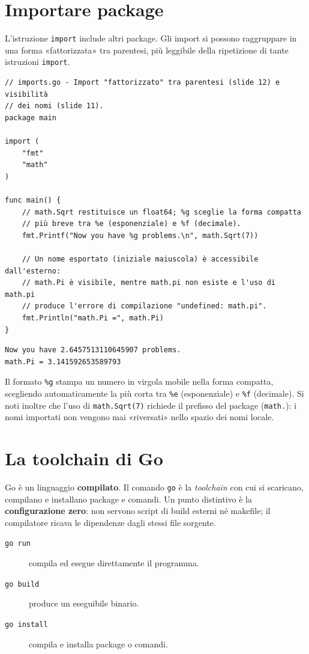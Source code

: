 \documentclass[11pt,a4paper]{report}
\newcommand{\cod}[1]{\texttt{#1}}
\begin{document}
\section{Importare package}\label{sec:import}

L'istruzione \cod{import} include altri package. Gli import si possono
raggruppare in una forma «fattorizzata» tra parentesi, più leggibile della
ripetizione di tante istruzioni \cod{import}.

\begin{lstlisting}[style=gocode,caption={\texttt{01\_basics/imports.go}}]
// imports.go - Import "fattorizzato" tra parentesi (slide 12) e visibilità
// dei nomi (slide 11).
package main

import (
	"fmt"
	"math"
)

func main() {
	// math.Sqrt restituisce un float64; %g sceglie la forma compatta
	// più breve tra %e (esponenziale) e %f (decimale).
	fmt.Printf("Now you have %g problems.\n", math.Sqrt(7))

	// Un nome esportato (iniziale maiuscola) è accessibile dall'esterno:
	// math.Pi è visibile, mentre math.pi non esiste e l'uso di math.pi
	// produce l'errore di compilazione "undefined: math.pi".
	fmt.Println("math.Pi =", math.Pi)
}
\end{lstlisting}
\begin{lstlisting}[style=output]
Now you have 2.6457513110645907 problems.
math.Pi = 3.141592653589793
\end{lstlisting}

Il formato \cod{\%g} stampa un numero in virgola mobile nella forma compatta,
scegliendo automaticamente la più corta tra \cod{\%e} (esponenziale) e \cod{\%f}
(decimale). Si noti inoltre che l'uso di \cod{math.Sqrt(7)} richiede il prefisso
del package (\cod{math.}): i nomi importati non vengono mai «riversati» nello
spazio dei nomi locale.

\section{La toolchain di Go}\label{sec:toolchain}

Go è un linguaggio \textbf{compilato}. Il comando \cod{go} è la \emph{toolchain}
con cui si scaricano, compilano e installano package e comandi. Un punto
distintivo è la \textbf{configurazione zero}: non servono script di build esterni
né makefile; il compilatore ricava le dipendenze dagli stessi file sorgente.

\begin{description}
  \item[\texttt{go run}] compila ed esegue direttamente il programma.
  \item[\texttt{go build}] produce un eseguibile binario.
  \item[\texttt{go install}] compila e installa package o comandi.
\end{description}
\end{document}
